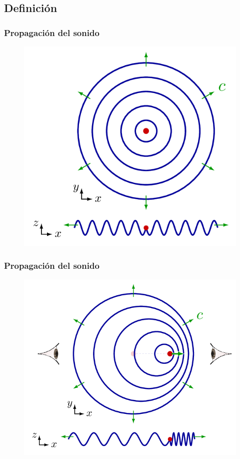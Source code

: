 \documentclass[14pt]{beamer}
\begin{document}
\subsection{Definición}

\begin{frame}
\frametitle{Propagación del sonido}
\vspace*{-1cm}
\begin{figure}
    \centering
    \includegraphics[scale=0.35]{Imagenes/Efecto_Doppler_01.png}
\end{figure}
\end{frame}
\begin{frame}
\frametitle{Propagación del sonido}
\vspace*{-1cm}
\begin{figure}
    \centering
    \includegraphics[scale=0.35]{Imagenes/Efecto_Doppler_02.png}
\end{figure}
\end{frame}
\end{document}
